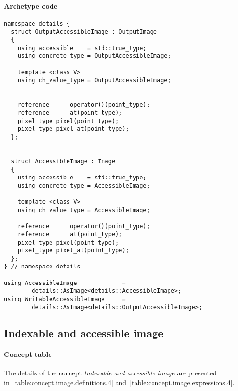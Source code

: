 \paragraph{Archetype code}
\begin{verbatim}
namespace details {
  struct OutputAccessibleImage : OutputImage
  {
    using accessible    = std::true_type;
    using concrete_type = OutputAccessibleImage;

    template <class V>
    using ch_value_type = OutputAccessibleImage;


    reference      operator()(point_type);
    reference      at(point_type);
    pixel_type pixel(point_type);
    pixel_type pixel_at(point_type);
  };


  struct AccessibleImage : Image
  {
    using accessible    = std::true_type;
    using concrete_type = AccessibleImage;

    template <class V>
    using ch_value_type = AccessibleImage;

    reference      operator()(point_type);
    reference      at(point_type);
    pixel_type pixel(point_type);
    pixel_type pixel_at(point_type);
  };
} // namespace details

using AccessibleImage             =
        details::AsImage<details::AccessibleImage>;
using WritableAccessibleImage     =
        details::AsImage<details::OutputAccessibleImage>;
\end{verbatim}


\clearpage

\subsection{Indexable and accessible image}

\paragraph{Concept table}

The details of the concept \emph{Indexable and accessible image} are presented
in~\cref{table:concept.image.definitions.4} and~\cref{table:concept.image.expressions.4}.

